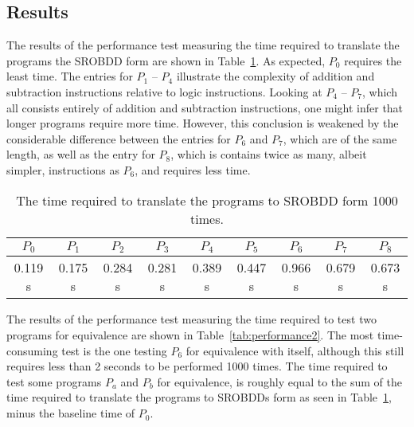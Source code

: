 \documentclass[a4paper,11pt]{kth-mag}
\begin{document}

\subsection{Results}

The results of the performance test measuring the time required to translate the programs the SROBDD form are shown in Table~\ref{tab:performance1}.
As expected, $P_0$ requires the least time.
The entries for $P_1$ -- $P_4$ illustrate the complexity of addition and subtraction instructions relative to logic instructions.
Looking at $P_4$ -- $P_7$, which all consists entirely of addition and subtraction instructions, one might infer that longer programs require more time.
However, this conclusion is weakened by the considerable difference between the entries for $P_6$ and $P_7$, which are of the same length,
as well as the entry for $P_8$, which is contains twice as many, albeit simpler, instructions as $P_6$, and requires less time.

\begin{table}
\centering
\begin{tabular}{*{9}{c}}
$P_0$   & $P_1$   & $P_2$   & $P_3$   & $P_4$   & $P_5$   & $P_6$   & $P_7$   & $P_8$   \\
\hline
0.119 s & 0.175 s & 0.284 s & 0.281 s & 0.389 s & 0.447 s & 0.966 s & 0.679 s & 0.673 s \\
\end{tabular}
\caption{The time required to translate the programs to SROBDD form 1000 times.}
\label{tab:performance1}
\end{table}

The results of the performance test measuring the time required to test two programs for equivalence are shown in Table~\ref{tab:performance2}.
The most time-consuming test is the one testing $P_6$ for equivalence with itself, although this still requires less than 2 seconds to be performed 1000 times.
The time required to test some programs $P_a$ and $P_b$ for equivalence, is roughly equal to the sum of the time required to translate the programs to SROBDDs form as seen in Table~\ref{tab:performance1}, minus the baseline time of $P_0$.
\end{document}
